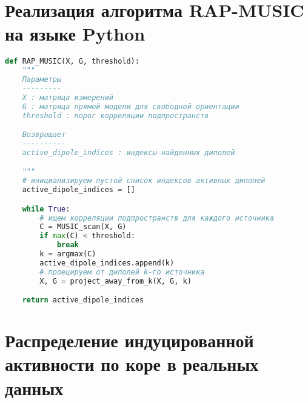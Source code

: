 \chapter{Реализация алгоритма RAP-MUSIC на языке Python}\label{appendix:rap_music_code}

\begin{ListingEnv}[!h]
    \begin{lstlisting}[language=Python,label={rap_music_listing},caption={Алгоритм RAP-MUSIC}]
def RAP_MUSIC(X, G, threshold):
    """
    Параметры
    ---------
    X : матрица измерений
    G : матрица прямой модели для свободной ориентации
    threshold : порог корреляции подпространств

    Возвращает
    ----------
    active_dipole_indices : индексы найденных диполей

    """
    # инициализируем пустой список индексов активных диполей
    active_dipole_indices = []

    while True:
        # ищем корреляции подпространств для каждого источника
        C = MUSIC_scan(X, G)
        if max(C) < threshold:
            break
        k = argmax(C)
        active_dipole_indices.append(k) 
        # проецируем от диполей k-го источника
        X, G = project_away_from_k(X, G, k) 

    return active_dipole_indices
    \end{lstlisting}
\end{ListingEnv}

\chapter{Распределение индуцированной активности по коре в реальных данных}\label{appendix:real_data_power}
